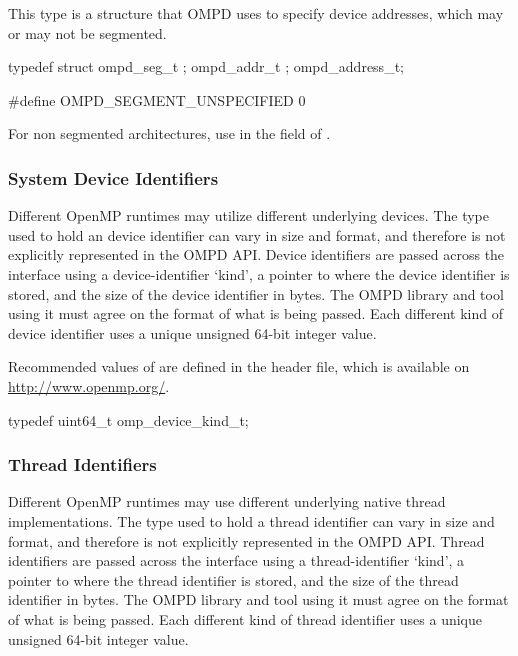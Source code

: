 This type is a structure that OMPD uses to specify device addresses, 
which may or may not be segmented.

\format

\begin{ccppspecific}
\begin{ompEnv}
typedef struct {
  ompd_seg_t ;
  ompd_addr_t ;
} ompd_address_t;

#define OMPD_SEGMENT_UNSPECIFIED 0
\end{ompEnv}
\end{ccppspecific}


For non segmented architectures, use  in the  
field of .

\subsubsection{System Device Identifiers}

Different OpenMP runtimes may utilize different underlying devices.
The type used to hold an device identifier can vary in size and format, and 
therefore is not explicitly represented in the OMPD API. Device identifiers are 
passed across the interface using a device-identifier `kind', a pointer to where
the device identifier is stored, and the size of the device identifier in bytes.
The OMPD library and tool using it must agree on the format
of what is being passed.
Each different kind of device identifier uses a unique
unsigned 64-bit integer value.

Recommended values of  are defined in the  
header file, which is available on \url{http://www.openmp.org/}. 

\label{ompd:omp_device_kind_t}
\format

	\begin{ccppspecific}
	\begin{ompSyntax}
typedef uint64_t omp_device_kind_t;
	\end{ompSyntax}
	\end{ccppspecific}


\subsubsection{Thread Identifiers}

Different OpenMP runtimes may use different underlying native
thread implementations.
The type used to hold a thread identifier can vary in size and format, and 
therefore is not explicitly represented in the OMPD API. Thread identifiers are 
passed across the interface using a thread-identifier `kind', a pointer to where
the thread identifier is stored, and the size of the thread identifier in bytes.
The OMPD library and tool using it must agree on the format
of what is being passed.
Each different kind of thread identifier uses a unique
unsigned 64-bit integer value.

